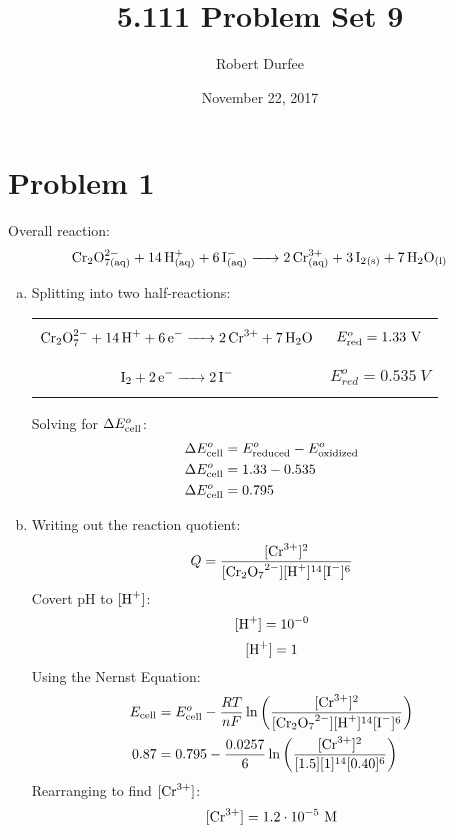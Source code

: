 \documentclass{article}
\title{ 5.111 Problem Set 9 }
\author{ Robert Durfee }
\date{ November 22, 2017 }
\begin{document}
\maketitle

\section*{ Problem 1 }

Overall reaction:
$$\ce{Cr_2O^{2-}_{7(aq)} + 14H^+_{(aq)} + 6I^-_{(aq)} -> 2Cr^{3+}_{(aq)} + 3I_2_{(s)} +
7H_2O_{(l)}}$$

\begin{enumerate}[a.]
    \item Splitting into two half-reactions:
        \begin{center}
            \begin{tabular}{c c}
                $$\ce{Cr_2O^{2-}_7 + 14H+ + 6e- -> 2Cr^{3+} + 7H_2O}$$ &
                $E^o_{\rm{red}}=1.33\ \si{V}$ \\
                $$\ce{I_2 + 2e- -> 2I^- }$$ & $E^o_{red}=0.535\ \si{V}$ 
            \end{tabular}
        \end{center}
        Solving for $\Delta E^o_{\rm{cell}}$:
        \begin{align*}
            \Delta E^o_{\rm{cell}} &= E^o_{\rm{reduced}} - E^o_{\rm{oxidized}} \\
            \Delta E^o_{\rm{cell}} &= 1.33 - 0.535 \\
            \Delta E^o_{\rm{cell}} &= 0.795
        \end{align*}
    \item Writing out the reaction quotient:
        $$Q=\frac{[\ce{Cr^{3+}}]^2}{[\ce{Cr_2O_7^{2-}}][\ce{H+}]^{14}[\ce{I-}]^6}$$
        Covert pH to $[\ce{H+}]$:
        $$[\ce{H+}] = 10^{-0}$$
        $$[\ce{H+}] = 1$$
        Using the Nernst Equation:
        \begin{align*}
            E_{\rm{cell}} &= E_{\rm{cell}}^o -
            \frac{RT}{nF}\ln\left(\frac{[\ce{Cr^{3+}}]^2}
            {[\ce{Cr_2O_7^{2-}}][\ce{H+}]^{14}[\ce{I-}]^6}\right) \\
            0.87 &= 0.795 - \frac{0.0257}{6}\ln\left(\frac{[\ce{Cr^{3+}}]^2}
            {[1.5][1]^{14}[0.40]^6}\right)
        \end{align*}
        Rearranging to find $[\ce{Cr^{3+}}]$:
        $$[\ce{Cr^{3+}}] = 1.2 \cdot 10^{-5}\ \si{M}$$
\end{enumerate}
\end{document}
